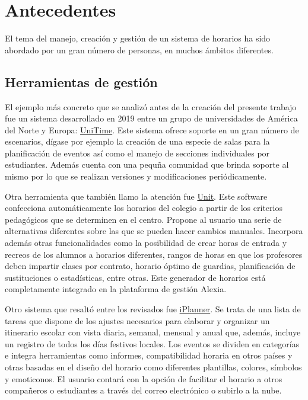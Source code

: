 \chapter{Antecedentes}\label{chapter:state_of_the_art}

El tema del manejo, creación y gestión de un sistema de horarios ha sido abordado por un gran número de personas, en muchos ámbitos diferentes.

\section{Herramientas de gestión}
El ejemplo más concreto que se analizó antes de la creación del presente trabajo fue un sistema desarrollado en 2019 entre un grupo de universidades de América del Norte y Europa: \href{https://www.unitime.org/}{UniTime}. Este sistema ofrece soporte en un gran número de escenarios, dígase por ejemplo la creación de una especie de salas para la planificación de eventos así como el manejo de secciones individuales por estudiantes. Además cuenta con una pequña comunidad que brinda soporte al mismo por lo que se realizan versiones y modificaciones periódicamente.

Otra herramienta que también llamo la atención fue \href{http://www.educaria.es/#horarios2}{Unit}. Este software confecciona automáticamente los horarios del colegio a partir de los criterios pedagógicos que se determinen en el centro. Propone al usuario una serie de alternativas diferentes sobre las que se pueden hacer cambios manuales. Incorpora además otras funcionalidades como la posibilidad de crear horas de entrada y recreos de los alumnos a horarios diferentes, rangos de horas en que los profesores deben impartir clases por contrato, horario óptimo de guardias, planificación de sustituciones o estadísticas, entre otras. Este generador de horarios está completamente integrado en la plataforma de gestión Alexia.

Otro sistema que resaltó entre los revisados fue \href{http://www.iplannerapp.com/}{iPlanner}. Se trata de una lista de tareas que dispone de los ajustes necesarios para elaborar y organizar un itinerario escolar con vista diaria, semanal, mensual y anual que, además, incluye un registro de todos los días festivos locales. Los eventos se dividen en categorías e integra herramientas como informes, compatibilidad horaria en otros países y otras basadas en el diseño del horario como diferentes plantillas, colores, símbolos y emoticonos. El usuario contará con la opción de facilitar el horario a otros compañeros o estudiantes a través del correo electrónico o subirlo a la nube. 

